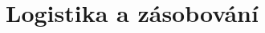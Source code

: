\documentclass[ekobook.tex]{subfiles}
\begin{document}
\section{Logistika a zásobování}
\newpage
\end{document}
